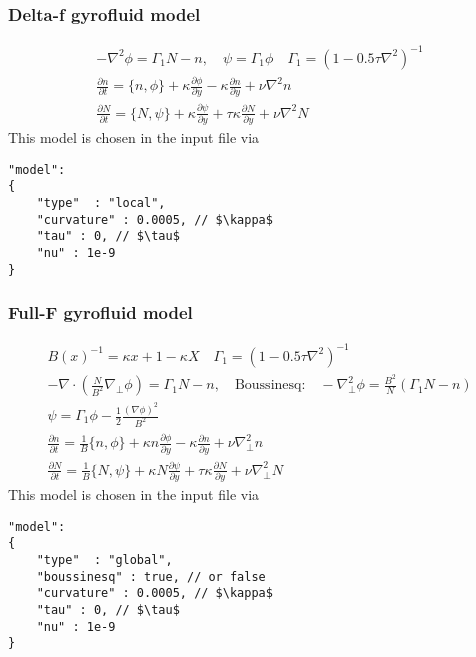 \subsubsection{Delta-f gyrofluid model}
\begin{subequations}
\begin{align}
 -\nabla^2 \phi =  \Gamma_1 N -n, \quad
\psi = \Gamma_1 \phi \quad \Gamma_1 = ( 1- 0.5\tau\nabla^2)^{-1} \\
 \frac{\partial n}{\partial t}     =
    \{ n, \phi\}
  + \kappa \frac{\partial \phi}{\partial y}
  -\kappa \frac{\partial n}{\partial y}
  + \nu \nabla^2 n  \\
  \frac{\partial N}{\partial t} =
  \{ N, \psi\}
  + \kappa \frac{\partial \psi}{\partial y}
  + \tau \kappa\frac{\partial N}{\partial y} +\nu\nabla^2N
\end{align}
\end{subequations}
This model is chosen in the input file via
\begin{verbatim}
"model":
{
    "type"  : "local",
    "curvature" : 0.0005, // $\kappa$
    "tau" : 0, // $\tau$
    "nu" : 1e-9
}
\end{verbatim}

\subsubsection{Full-F gyrofluid model}
\begin{subequations}
\begin{align}
B(x)^{-1} = \kappa x +1-\kappa X\quad \Gamma_1 = ( 1- 0.5\tau\nabla^2)^{-1}\\
 -\nabla\cdot \left(\frac{N}{B^2} \nabla_\perp \phi\right) = \Gamma_1 N-n, \quad
 \text{Boussinesq:}\quad -\nabla_\perp^2 \phi = \frac{B^2}{N} (\Gamma_1 N -n) \\
\psi = \Gamma_1 \phi - \frac{1}{2} \frac{(\nabla\phi)^2}{B^2}\\
 \frac{\partial n}{\partial t}     = 
    \frac{1}{B}\{ n, \phi\} 
  + \kappa n\frac{\partial \phi}{\partial y} 
  -\kappa \frac{\partial n}{\partial y}
  + \nu \nabla_\perp^2 n  \\
  \frac{\partial N}{\partial t} =
  \frac{1}{B}\{ N, \psi\} 
  + \kappa N\frac{\partial \psi}{\partial y} 
  + \tau \kappa\frac{\partial N}{\partial y} +\nu\nabla_\perp^2N
\end{align}
\end{subequations}
This model is chosen in the input file via
\begin{verbatim}
"model":
{
    "type"  : "global",
    "boussinesq" : true, // or false
    "curvature" : 0.0005, // $\kappa$
    "tau" : 0, // $\tau$
    "nu" : 1e-9
}
\end{verbatim}

